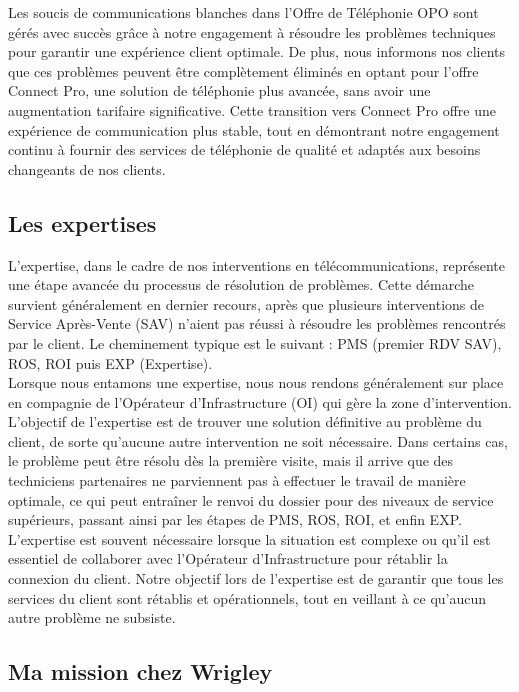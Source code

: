 \documentclass[12pt, a4paper]{article}
\begin{document}
Les soucis de communications blanches dans l'Offre de Téléphonie
OPO sont gérés avec succès grâce à notre engagement à résoudre
les problèmes techniques pour garantir une expérience client
optimale. De plus, nous informons nos clients que ces problèmes peuvent
être complètement éliminés en optant pour l'offre Connect Pro,
une solution de téléphonie plus avancée, sans avoir une
augmentation tarifaire significative. Cette transition vers
Connect Pro offre une expérience de communication plus stable,
tout en démontrant notre engagement continu à fournir des
services de téléphonie de qualité et adaptés aux besoins
changeants de nos clients.

\newpage
\subsection{Les expertises}
L'expertise, dans le cadre de nos interventions en télécommunications,
représente une étape avancée du processus de résolution de problèmes.
Cette démarche survient généralement en dernier recours, après que
plusieurs interventions de Service Après-Vente (SAV) n'aient pas
réussi à résoudre les problèmes rencontrés par le client. Le cheminement
typique est le suivant : PMS (premier RDV SAV), ROS, ROI puis EXP (Expertise).\\

Lorsque nous entamons une expertise, nous nous rendons généralement
sur place en compagnie de l'Opérateur d'Infrastructure (OI) qui gère
la zone d'intervention. L'objectif de l'expertise est de trouver
une solution définitive au problème du client, de sorte qu'aucune
autre intervention ne soit nécessaire. Dans certains cas, le problème
peut être résolu dès la première visite, mais il arrive que des
techniciens partenaires ne parviennent pas à effectuer le travail de
manière optimale, ce qui peut entraîner le renvoi du dossier pour
des niveaux de service supérieurs, passant ainsi par les étapes de
PMS, ROS, ROI, et enfin EXP.\\

L'expertise est souvent nécessaire lorsque la situation est complexe
ou qu'il est essentiel de collaborer avec l'Opérateur
d'Infrastructure pour rétablir la connexion du client. Notre objectif
lors de l'expertise est de garantir que tous les services du client
sont rétablis et opérationnels, tout en veillant à ce qu'aucun
autre problème ne subsiste. 

\newpage
\subsection{Ma mission chez Wrigley}
\end{document}
